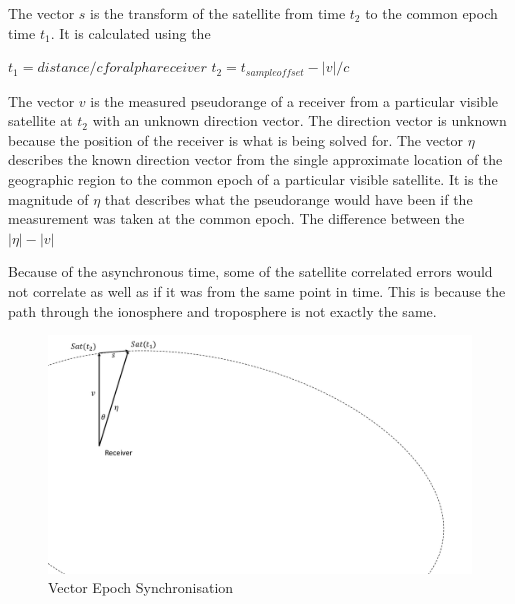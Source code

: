 The vector $s$ is the transform of the satellite from time $t_2$ to the common epoch time $t_1$. It is calculated using the 

$t_1 = distance/c for alpha receiver$ 
$t_2 = t_{sampleoffset}- |v|/c$

The vector $v$ is the measured pseudorange of a receiver from a particular visible satellite at $t_2$ with an unknown direction vector. The direction vector is unknown because the position of the receiver is what is being solved for. The vector $\eta$ describes the known direction vector from the single approximate location of the geographic region to the common epoch of a particular visible satellite. It is the magnitude of $\eta$ that describes what the pseudorange would have been if the measurement was taken at the common epoch. The difference between the  $|\eta|-|v|$

Because of the asynchronous time, some of the satellite correlated errors would not correlate as well as if it was from the same point in time. This is because the path through the ionosphere and troposphere is not exactly the same. 


\begin{figure}
\centering
\caption{Vector Epoch Synchronisation}
\label{Fig:epochsync}
\includegraphics[trim=0 10cm 23cm 0,clip,width=0.6\linewidth]{ChapterPerception/Figures/epochalignment.pdf}
\end{figure}









